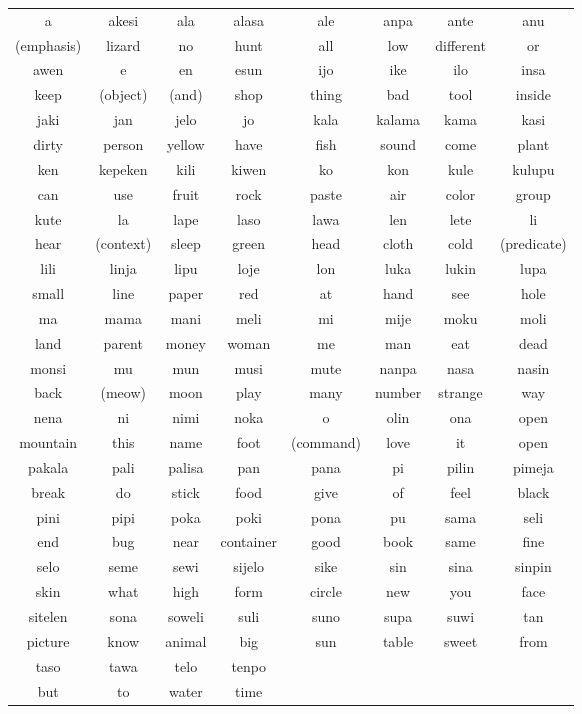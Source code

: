 \documentclass[10pt,a4paper]{article}
\begin{document}
\begin{center}
\begin{tabular}{cccccccc}
\toprule
a & akesi & ala & alasa & ale & anpa & ante & anu\\
(emphasis) & lizard & no & hunt & all & low & different & or\\
\midrule
awen & e & en & esun & ijo & ike & ilo & insa\\
keep & (object) & (and) & shop & thing & bad & tool & inside\\
\midrule
jaki & jan & jelo & jo & kala & kalama & kama & kasi\\
dirty & person & yellow & have & fish & sound & come & plant\\
\midrule
ken & kepeken & kili & kiwen & ko & kon & kule & kulupu\\
can & use & fruit & rock & paste & air & color & group\\
\midrule
kute & la & lape & laso & lawa & len & lete & li\\
hear & (context) & sleep & green & head & cloth & cold & (predicate)\\
\midrule
lili & linja & lipu & loje & lon & luka & lukin & lupa\\
small & line & paper & red & at & hand & see & hole\\
\midrule
ma & mama & mani & meli & mi & mije & moku & moli\\
land & parent & money & woman & me & man & eat & dead\\
\midrule
monsi & mu & mun & musi & mute & nanpa & nasa & nasin\\
back & (meow) & moon & play & many & number & strange & way\\
\midrule
nena & ni & nimi & noka & o & olin & ona & open\\
mountain & this & name & foot & (command) & love & it & open\\

\midrule
pakala & pali & palisa & pan & pana & pi & pilin & pimeja\\
break & do & stick & food & give & of & feel & black\\
\midrule
pini & pipi & poka & poki & pona & pu & sama & seli\\
end & bug & near & container & good & book & same & fine\\

\midrule
selo & seme & sewi & sijelo & sike & sin & sina & sinpin\\
skin & what & high & form & circle & new & you & face\\

\midrule
sitelen & sona & soweli & suli & suno & supa & suwi & tan\\
picture & know & animal & big & sun & table & sweet & from\\

\midrule
taso & tawa & telo & tenpo & & & & \\
but & to & water & time & & & & \\
\bottomrule
\end{tabular}
\end{center}
\end{document}
